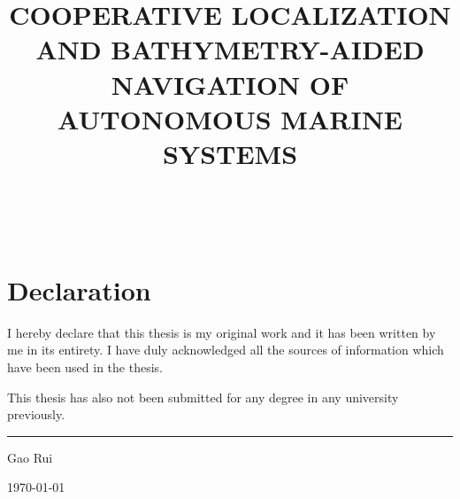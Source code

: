 \documentclass[a4paper, 12pt, oneside]{Thesis}
\theoremstyle{plain}
\begin{document}
\frontmatter        %

\title      {COOPERATIVE LOCALIZATION AND BATHYMETRY-AIDED NAVIGATION OF AUTONOMOUS MARINE SYSTEMS }\\


\maketitle

    \chapter*{\centering Declaration}
\begin{center}

I hereby declare that this thesis is my original work and it has been written by me in its entirety. I have duly acknowledged all the sources of information which have been used in the thesis.

This thesis has also not been submitted for any degree in any university previously.


\vspace{20mm}  %

\rule{40mm}{.15mm}\par   %
 Gao Rui\par
\today
\end{center}
\end{document}
